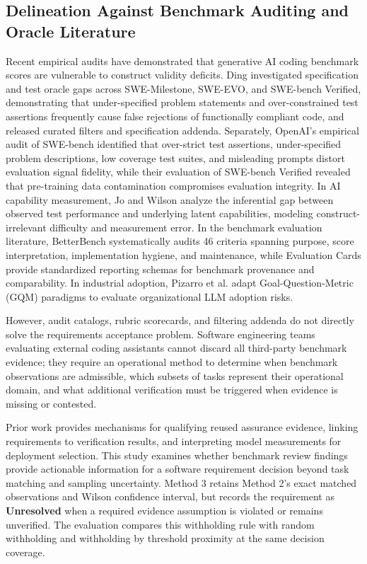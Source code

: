 \documentclass[runningheads]{llncs}
\begin{document}
\subsection{Delineation Against Benchmark Auditing and Oracle Literature}
Recent empirical audits have demonstrated that generative AI coding benchmark scores are vulnerable to construct validity deficits. Ding \cite{ding_spec_oracle_gaps_2026} investigated specification and test oracle gaps across SWE-Milestone, SWE-EVO, and SWE-bench Verified, demonstrating that under-specified problem statements and over-constrained test assertions frequently cause false rejections of functionally compliant code, and released curated filters and specification addenda. Separately, OpenAI's empirical audit of SWE-bench \cite{openai_swebench_audit_2026} identified that over-strict test assertions, under-specified problem descriptions, low coverage test suites, and misleading prompts distort evaluation signal fidelity, while their evaluation of SWE-bench Verified \cite{openai_swebench_verified_contamination_2025} revealed that pre-training data contamination compromises evaluation integrity. In AI capability measurement, Jo and Wilson \cite{jo_wilson_what_does_your_benchmark_measure} analyze the inferential gap between observed test performance and underlying latent capabilities, modeling construct-irrelevant difficulty and measurement error. In the benchmark evaluation literature, BetterBench \cite{reuel_betterbench} systematically audits 46 criteria spanning purpose, score interpretation, implementation hygiene, and maintenance, while Evaluation Cards \cite{ghosh_evaluation_cards_2026} provide standardized reporting schemas for benchmark provenance and comparability. In industrial adoption, Pizarro et al. \cite{pizarro_beyond_the_hype_2026} adapt Goal-Question-Metric (GQM) paradigms to evaluate organizational LLM adoption risks.

However, audit catalogs, rubric scorecards, and filtering addenda do not directly solve the requirements acceptance problem. Software engineering teams evaluating external coding assistants cannot discard all third-party benchmark evidence; they require an operational method to determine when benchmark observations are admissible, which subsets of tasks represent their operational domain, and what additional verification must be triggered when evidence is missing or contested.

Prior work provides mechanisms for qualifying reused assurance evidence, linking requirements to verification results, and interpreting model measurements for deployment selection. This study examines whether benchmark review findings provide actionable information for a software requirement decision beyond task matching and sampling uncertainty. Method 3 retains Method 2's exact matched observations and Wilson confidence interval, but records the requirement as \textbf{Unresolved} when a required evidence assumption is violated or remains unverified. The evaluation compares this withholding rule with random withholding and withholding by threshold proximity at the same decision coverage.
\end{document}
